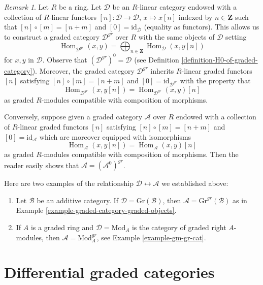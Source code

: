 \documentclass{stacks-project}
\theoremstyle{plain}
\theoremstyle{definition}
\theoremstyle{remark}
\newtheorem{remark}[subsection]{Remark}
\numberwithin{equation}{subsection}
\def\Hom{\mathop{\mathrm{Hom}}\nolimits}
\begin{document}
\begin{remark}
\label{remark-graded-shift-functors}
Let $R$ be a ring. Let $\mathcal{D}$ be an $R$-linear category endowed with a
collection of $R$-linear functors $[n] : \mathcal{D} \to \mathcal{D}$,
$x \mapsto x[n]$ indexed by $n \in \mathbf{Z}$ such that
$[n] \circ [m] = [n + m]$ and $[0] = \text{id}_\mathcal{D}$ (equality as
functors). This allows us to construct a graded category $\mathcal{D}^{gr}$
over $R$ with the same objects of $\mathcal{D}$ setting
$$
\Hom_{\mathcal{D}^{gr}}(x, y) =
\bigoplus\nolimits_{n \in \mathbf{Z}} \Hom_\mathcal{D}(x, y[n])
$$
for $x, y$ in $\mathcal{D}$. Observe that $(\mathcal{D}^{gr})^0 = \mathcal{D}$
(see Definition \ref{definition-H0-of-graded-category}). Moreover, the graded
category $\mathcal{D}^{gr}$ inherits $R$-linear graded functors $[n]$
satisfying $[n] \circ [m] = [n + m]$ and $[0] = \text{id}_{\mathcal{D}^{gr}}$
with the property that
$$
\Hom_{\mathcal{D}^{gr}}(x, y[n]) = \Hom_{\mathcal{D}^{gr}}(x, y)[n]
$$
as graded $R$-modules compatible with composition of morphisms.

\medskip\noindent
Conversely, suppose given a graded category $\mathcal{A}$ over $R$ endowed
with a collection of $R$-linear graded functors $[n]$
satisfying $[n] \circ [m] = [n + m]$ and $[0] = \text{id}_\mathcal{A}$
which are moreover equipped with isomorphisms
$$
\Hom_\mathcal{A}(x, y[n]) = \Hom_\mathcal{A}(x, y)[n]
$$
as graded $R$-modules compatible with composition of morphisms. Then
the reader easily shows that $\mathcal{A} = (\mathcal{A}^0)^{gr}$.

\medskip\noindent
Here are two examples of the relationship
$\mathcal{D} \leftrightarrow \mathcal{A}$ we established above:
\begin{enumerate}
\item Let $\mathcal{B}$ be an additive category. If
$\mathcal{D} = \text{Gr}(\mathcal{B})$, then
$\mathcal{A} = \text{Gr}^{gr}(\mathcal{B})$ as in
Example \ref{example-graded-category-graded-objects}.
\item If $A$ is a graded ring and $\mathcal{D} = \text{Mod}_A$
is the category of graded right $A$-modules, then
$\mathcal{A} = \text{Mod}^{gr}_A$, see Example \ref{example-gm-gr-cat}.
\end{enumerate}
\end{remark}






\section{Differential graded categories}
\label{section-dga-categories}
\end{document}
